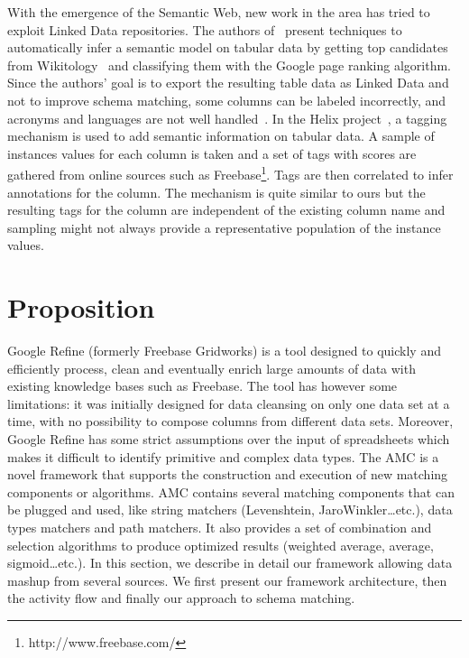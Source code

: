 \documentclass{../../Util/LaTEX/sig-alternate}
\begin{document}
With the emergence of the Semantic Web, new work in the area has tried to exploit Linked Data repositories. The authors of~\cite{Syed2010Tables} present techniques to automatically infer a semantic model on tabular data by getting top candidates from Wikitology~\cite{conf/aaaiss/FininSMMP09} and classifying them with the Google page ranking algorithm. Since the authors' goal is to export the resulting table data as Linked Data and not to improve schema matching, some columns can be labeled incorrectly, and acronyms and languages are not well handled~\cite{Syed2010Tables}. In the Helix project~\cite{conf/www/HassanzadehDFKSW11}, a tagging mechanism is used to add semantic information on tabular data. A sample of instances values for each column is taken and a set of tags with scores are gathered from online sources such as Freebase\footnote{http://www.freebase.com/}. Tags are then correlated to infer annotations for the column. The mechanism is quite similar to ours but the resulting tags for the column are independent of the existing column name and sampling might not always provide a representative population of the instance values.


\section{Proposition}

Google Refine (formerly Freebase Gridworks) is a tool designed to quickly and efficiently process, clean and eventually enrich large amounts of data with existing knowledge bases such as Freebase. The tool has however some limitations: it was initially designed for data cleansing on only one data set at a time, with no possibility to compose columns from different data sets. Moreover, Google Refine has some strict assumptions over the input of spreadsheets which makes it difficult to identify primitive and complex data types.
The AMC is a novel framework that supports the construction and execution of new matching components or algorithms. AMC contains several matching components that can be plugged and used, like string matchers (Levenshtein, JaroWinkler\dots  etc.), data types matchers and path matchers. It also provides a set of combination and selection algorithms to produce optimized results (weighted average, average, sigmoid\dots  etc.).
In this section, we describe in detail our framework allowing data mashup from several sources. We first present our framework architecture, then the activity flow and finally our approach to schema matching.
\end{document}
